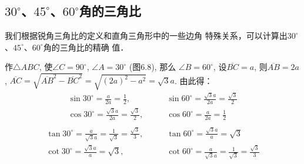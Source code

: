 \subsection{$30^{\circ}$、$45^{\circ}$、$60^{\circ}$角的三角比}
我们根据锐角三角比的定义和直角三角形中的一些边角
特殊关系，可以计算出$30^{\circ}$、$45^{\circ}$、$60^{\circ}$角的三角比的精确
值．

作$\triangle ABC$, 使$\angle C=90^{\circ}$,
$\angle A=30^{\circ}$ (图6.8), 那么
$\angle B=60^{\circ}$, 设$\overline{BC}=a$, 则$\overline{AB}=2a$, $\overline{AC}=\sqrt{\overline{AB}^2-\overline{BC}^2}=
\sqrt{(2a)^2-a^2}=\sqrt{3}a$. 
由此得：
\[\begin{split}
    \sin 30^{\circ}=\frac{a}{2a}=\frac{1}{2},&\qquad \sin 60^{\circ}=\frac{\sqrt{3}a}{2a}=\frac{\sqrt{3}}{2}\\
    \cos 30^{\circ}=\frac{\sqrt{3}a}{2a}=\frac{\sqrt{3}}{2},&\qquad \cos 60^{\circ}=\frac{a}{2a}=\frac{1}{2}\\  
\end{split}\]
\[\begin{split}
    \tan 30^{\circ}=\frac{a}{\sqrt{3}a}=\frac{1}{\sqrt{3}}=\frac{\sqrt{3}}{3},&\qquad \tan 60^{\circ}=\frac{\sqrt{3}a}{a}=\sqrt{3}\\
    \cot 30^{\circ}=\frac{\sqrt{3}a}{a}=\sqrt{3},&\qquad \cot 60^{\circ}=\frac{a}{\sqrt{3}a}=\frac{1}{\sqrt{3}}=\frac{\sqrt{3}}{3}\\  
\end{split}\]

\begin{figure}[htp]\centering
    \begin{minipage}[t]{0.48\textwidth}
    \centering
{}
    \caption{}
    \end{minipage}
    \begin{minipage}[t]{0.48\textwidth}
    \centering
    \caption{}
    \end{minipage}
    \end{figure}

